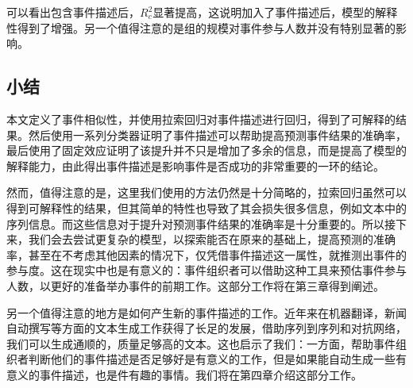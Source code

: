 \documentclass[12pt]{template}
\begin{document}
可以看出包含事件描述后，\(R_c^2\)显著提高，这说明加入了事件描述后，模型的解释性得到了增强。另一个值得注意的是组的规模对事件参与人数并没有特别显著的影响。

\subsection{小结}
本文定义了事件相似性，并使用拉索回归对事件描述进行回归，得到了可解释的结果。然后使用一系列分类器证明了事件描述可以帮助提高预测事件结果的准确率，最后使用了固定效应证明了该提升并不只是增加了多余的信息，而是提高了模型的解释能力，由此得出事件描述是影响事件是否成功的非常重要的一环的结论。

然而，值得注意的是，这里我们使用的方法仍然是十分简略的，拉索回归虽然可以得到可解释性的结果，但其简单的特性也导致了其会损失很多信息，例如文本中的序列信息。而这些信息对于提升对预测事件结果的准确率是十分重要的。所以接下来，我们会去尝试更复杂的模型，以探索能否在原来的基础上，提高预测的准确率，甚至在不考虑其他因素的情况下，仅凭借事件描述这一属性，就推测出事件的参与度。这在现实中也是有意义的：事件组织者可以借助这种工具来预估事件参与人数，以更好的准备举办事件的前期工作。这部分工作将在第三章得到阐述。

另一个值得注意的地方是如何产生新的事件描述的工作。近年来在机器翻译，新闻自动撰写等方面的文本生成工作获得了长足的发展，借助序列到序列和对抗网络，我们可以生成通顺的，质量足够高的文本。这也启示了我们：一方面，帮助事件组织者判断他们的事件描述是否足够好是有意义的工作，但是如果能自动生成一些有意义的事件描述，也是件有趣的事情。我们将在第四章介绍这部分工作。
\end{document}
